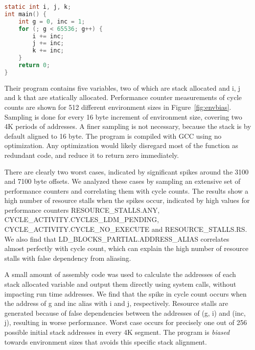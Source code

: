 \documentclass[a4paper,10pt,twocolumn,twoside]{article}
\begin{document}
\begin{lstlisting}[float=h, language=C, caption={Microkernel succeptible to aliasing between static variables and automatic variables for certain environment sizes}, label={lst:loopkernel}, frame=lines]
static int i, j, k;
int main() {
    int g = 0, inc = 1;
    for (; g < 65536; g++) {
        i += inc;
        j += inc;
        k += inc; 
    }
    return 0;
}
\end{lstlisting}

Their program contains five variables, two of which are stack allocated and i, j and k that are statically allocated.
Performance counter measurements of cycle counts are shown for 512 different environment sizes in Figure~\ref{fig:envbias}.
Sampling is done for every 16 byte increment of environment size, covering two 4K periods of addresses.
A finer sampling is not necessary, because the stack is by default aligned to 16 byte.
The program is compiled with GCC using no optimization.
Any optimization would likely disregard most of the function as redundant code, and reduce it to return zero immediately.

There are clearly two worst cases, indicated by significant spikes around the 3100 and 7100 byte offsets.
We analyzed these cases by sampling an extensive set of performance counters and correlating them with cycle counts.
The results show a high number of resource stalls when the spikes occur, indicated by high values for performance counters \small{RESOURCE\_STALLS.ANY}, \small{CYCLE\_ACTIVITY.CYCLES\_LDM\_PENDING}, \small{CYCLE\_ACTIVITY.CYCLE\_NO\_EXECUTE} and \small{RESOURCE\_STALLS.RS}.
We also find that \small{LD\_BLOCKS\_PARTIAL.ADDRESS\_ALIAS} correlates almost perfectly with cycle count, which can explain the high number of resource stalls with false dependency from aliasing.

A small amount of assembly code was used to calculate the addresses of each stack allocated variable and output them directly using system calls, without impacting run time addresses.
We find that the spike in cycle count occurs when the address of g and inc alias with i and j, respectively.
Resource stalls are generated because of false dependencies between the addresses of (g, i) and (inc, j), resulting in worse performance.
Worst case occurs for precisely one out of 256 possible initial stack addresses in every 4K segment.
The program is \emph{biased} towards environment sizes that avoids this specific stack alignment.
\end{document}
